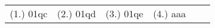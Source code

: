 \begin{eocexercises}{}
\begin{enumerate}
\end{enumerate}


\par \practiceinfo
\par \begin{tabular}[h]{cccccc}
(1.)	01qc	&
(2.)	01qd	&
(3.)	01qe	&

(4.) aaa &
\end{tabular}

\end{eocexercises}









